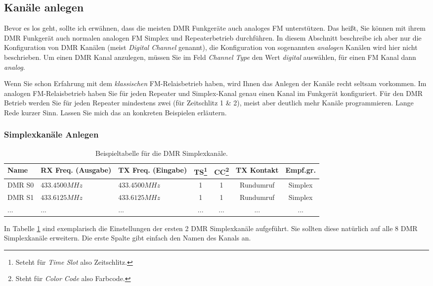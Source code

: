 \subsection{Kanäle anlegen} \label{sec:cp:channel}
Bevor es los geht, sollte ich erwähnen, dass die meisten DMR Funkgeräte auch analoges FM unterstützen. Das heißt, Sie können mit ihrem DMR Funkgerät auch normalen analogen FM Simplex und Repeaterbetrieb durchführen. In diesem Abschnitt beschreibe ich aber nur die Konfiguration von DMR Kanälen (meist \emph{Digital Channel} genannt), die Konfiguration von sogenannten \emph{analogen} Kanälen wird hier nicht beschrieben. Um einen DMR Kanal anzulegen, müssen Sie im Feld \emph{Channel Type} den Wert \emph{digital} auswählen, für einen FM Kanal dann \emph{analog}.

Wenn Sie schon Erfahrung mit dem \emph{klassischen} FM-Relaisbetrieb haben, wird Ihnen das Anlegen der Kanäle recht seltsam vorkommen. Im analogen FM-Relaisbetrieb haben Sie für jeden Repeater und Simplex-Kanal genau einen Kanal im Funkgerät konfiguriert. Für den DMR Betrieb werden Sie für jeden Repeater mindestens zwei (für Zeitschlitz 1 \& 2), meist aber deutlich mehr Kanäle programmieren. Lange Rede kurzer Sinn. Lassen Sie mich das an konkreten Beispielen erläutern.

\subsubsection{Simplexkanäle Anlegen}
\begin{table}[!ht]
 \begin{tabular}{|l|p{2.5cm}|p{2.5cm}|c|c|c|c|} \hline
 Name       & RX Freq. (Ausgabe) & TX Freq. (Eingabe) & TS\footnote{Seteht für \emph{Time Slot} also Zeitschlitz.} & CC\footnote{Steht für \emph{Color Code} also Farbcode.} & TX Kontakt & Empf.gr. \\ \hline
 DMR S0     & $433.4500 MHz$     & $433.4500 MHz$     & 1           & 1        & Rundumruf  & Simplex \\
 DMR S1     & $433.6125 MHz$     & $433.6125 MHz$     & 1           & 1        & Rundumruf  & Simplex \\
 ...        & ...                & ...                & ...         & ...      & ...        & ... \\ \hline
 \end{tabular}
 \caption{Beispieltabelle für die DMR Simplexkanäle.} \label{tab:ch:simplex}
\end{table}

In Tabelle \ref{tab:ch:simplex} sind exemplarisch die Einstellungen der ersten 2 DMR Simplexkanäle aufgeführt. Sie sollten diese natürlich auf alle 8 DMR Simplexkanäle erweitern. Die erste Spalte gibt einfach den Namen des Kanals an. 


